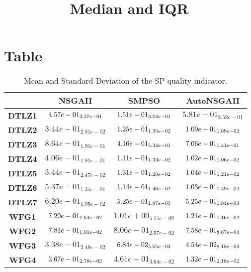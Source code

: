 \documentclass{article}
\title{Median and IQR}
\author{}
\begin{document}
\maketitle
\section{Table}
\begin{table}[!htp]
  \caption{Mean and Standard Deviation of the SP quality indicator.}
  \label{table:SP}
  \centering
  \begin{scriptsize}
  \begin{tabular}{c|ccc}
      & \textbf{NSGAII} & \textbf{SMPSO} & \textbf{AutoNSGAII} \\\hline
      \textbf{DTLZ1} & $\cellcolor{gray25} 4.57e-01_{3.27e-01} $ & $ \cellcolor{gray95} 1.51e-01_{3.04e-01} $ & $ 5.81e-01_{2.52e-01}$ \\
      \textbf{DTLZ2} & $3.44e-01_{2.81e-02} $ & $ \cellcolor{gray25} 1.25e-01_{1.35e-02} $ & $ \cellcolor{gray95} 1.09e-01_{1.69e-02}$ \\
      \textbf{DTLZ3} & $8.64e-01_{1.91e-01} $ & $ \cellcolor{gray95} 4.16e-01_{5.34e-01} $ & $ \cellcolor{gray25} 7.06e-01_{1.41e-01}$ \\
      \textbf{DTLZ4} & $4.06e-01_{1.81e-01} $ & $ \cellcolor{gray25} 1.11e-01_{1.33e-02} $ & $ \cellcolor{gray95} 1.02e-01_{1.06e-02}$ \\
      \textbf{DTLZ5} & $3.44e-01_{2.47e-02} $ & $ \cellcolor{gray25} 1.31e-01_{1.20e-02} $ & $ \cellcolor{gray95} 1.04e-01_{1.21e-02}$ \\
      \textbf{DTLZ6} & $5.37e-01_{1.35e-01} $ & $ \cellcolor{gray25} 1.14e-01_{1.46e-02} $ & $ \cellcolor{gray95} 1.03e-01_{1.59e-02}$ \\
      \textbf{DTLZ7} & $6.20e-01_{1.95e-02} $ & $ \cellcolor{gray95} 5.25e-01_{1.87e-03} $ & $ \cellcolor{gray25} 5.25e-01_{1.84e-03}$ \\
      \textbf{WFG1} & $\cellcolor{gray25} 7.20e-01_{7.64e-02} $ & $ 1.01e+00_{5.15e-02} $ & $ \cellcolor{gray95} 1.21e-01_{1.16e-02}$ \\
      \textbf{WFG2} & $\cellcolor{gray25} 7.81e-01_{1.01e-02} $ & $ 8.06e-01_{2.57e-02} $ & $ \cellcolor{gray95} 7.58e-01_{8.67e-04}$ \\
      \textbf{WFG3} & $3.38e-01_{2.48e-02} $ & $ \cellcolor{gray25} 6.84e-02_{5.05e-03} $ & $ \cellcolor{gray95} 4.54e-02_{8.18e-03}$ \\
      \textbf{WFG4} & $\cellcolor{gray25} 3.67e-01_{2.78e-02} $ & $ 4.61e-01_{3.64e-02} $ & $ \cellcolor{gray95} 1.32e-01_{2.18e-02}$ \\

\end{tabular}
\end{scriptsize}
\end{table}
\end{document}
